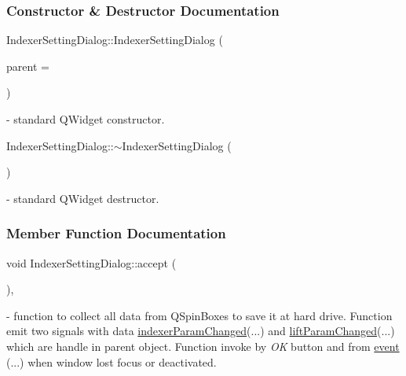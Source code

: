 \subsubsection{Constructor \& Destructor Documentation}
\mbox{\label{classIndexerSettingDialog_ad2c64f92d2d17bc3d8045dd84eeb71e8}} 
{\footnotesize\ttfamily Indexer\+Setting\+Dialog\+::\+\texorpdfstring{Indexer\+Setting\+Dialog}{IndexerSettingDialog} (\begin{DoxyParamCaption}\item[{Q\+Widget $\ast$}]{parent = {} }\end{DoxyParamCaption}){\ttfamily [explicit]}} - standard Q\+Widget constructor.

\mbox{\label{classIndexerSettingDialog_a87b6ba4152cb2b6a02a93e502d7b64ff}} 
{\footnotesize\ttfamily Indexer\+Setting\+Dialog\+::\texorpdfstring{$\sim$\+Indexer\+Setting\+Dialog}{~IndexerSettingDialog} (\begin{DoxyParamCaption}{ }\end{DoxyParamCaption})} - standard Q\+Widget destructor.



\subsubsection{Member Function Documentation}
\mbox{\label{classIndexerSettingDialog_a32e867b5d070ed40929837ebc4b45a78}} 
{\footnotesize\ttfamily void Indexer\+Setting\+Dialog\+::\texorpdfstring{accept}{accept} (\begin{DoxyParamCaption}{ }\end{DoxyParamCaption}){\ttfamily [private]}, {\ttfamily [slot]}} - function to collect all data from Q\+Spin\+Boxes to save it at hard drive. Function emit two signals with data \hyperlink{classIndexerSettingDialog_a231edf60936e09b15972951f8a7751e7}{indexer\+Param\+Changed}(...) and \hyperlink{classIndexerSettingDialog_a40d9bb1a05d0afb9bb8a0191f611d78c}{lift\+Param\+Changed}(...) which are handle in parent object. Function invoke by \textit{OK} button and from \hyperlink{classIndexerSettingDialog_a20a34151fec7c14426e8ff8b210d1cc9}{event} (...) when window lost focus or deactivated. 

